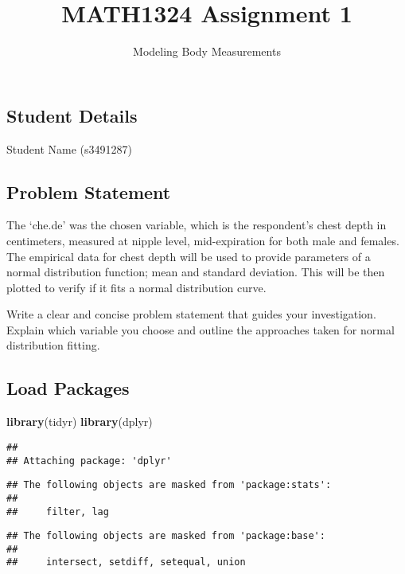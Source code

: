\documentclass[]{article}
\title{MATH1324 Assignment 1}
\subtitle{Modeling Body Measurements}
\author{}
\date{}
\newenvironment{Shaded}{\begin{snugshade}}{\end{snugshade}}
\newcommand{\KeywordTok}[1]{\textcolor[rgb]{0.13,0.29,0.53}{\textbf{#1}}}
\newcommand{\NormalTok}[1]{#1}
\begin{document}
\maketitle

\hypertarget{student-details}{%
\subsection{Student Details}\label{student-details}}

Student Name (s3491287)

\hypertarget{problem-statement}{%
\subsection{Problem Statement}\label{problem-statement}}

The `che.de' was the chosen variable, which is the respondent's chest
depth in centimeters, measured at nipple level, mid-expiration for both
male and females. The empirical data for chest depth will be used to
provide parameters of a normal distribution function; mean and standard
deviation. This will be then plotted to verify if it fits a normal
distribution curve.

Write a clear and concise problem statement that guides your
investigation. Explain which variable you choose and outline the
approaches taken for normal distribution fitting.

\hypertarget{load-packages}{%
\subsection{Load Packages}\label{load-packages}}

\begin{Shaded}
\begin{Highlighting}[]
\KeywordTok{library}\NormalTok{(tidyr)}
\KeywordTok{library}\NormalTok{(dplyr)}
\end{Highlighting}
\end{Shaded}

\begin{verbatim}
## 
## Attaching package: 'dplyr'
\end{verbatim}

\begin{verbatim}
## The following objects are masked from 'package:stats':
## 
##     filter, lag
\end{verbatim}

\begin{verbatim}
## The following objects are masked from 'package:base':
## 
##     intersect, setdiff, setequal, union
\end{verbatim}
\end{document}
